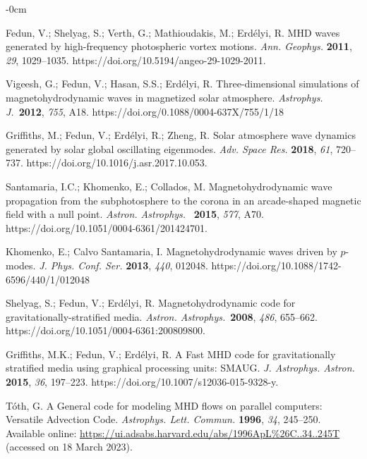 \documentclass[physics,article,accept,pdftex,moreauthors]{Definitions/mdpi}
\newcommand{\aap}{{\it Astron. Astrophys.}}
\newcommand{\apj}{{\it Astrophys. J.}}
\begin{document}
\begin{adjustwidth}{-\extralength}{0cm}
\begin{thebibliography}{999}
		Fedun, V.; Shelyag, S.; Verth, G.; Mathioudakis, M.; Erd\'elyi, R. MHD waves generated by high-frequency photospheric vortex 
motions. \emph{Ann. Geophys.} \textbf{2011}, \emph{29}, 1029--1035. https://doi.org/10.5194/angeo-29-1029-2011.
		
		{Vigeesh}, G.; {Fedun}, V.; {Hasan}, S.S.; {Erd{\'e}lyi}, R. {Three-dimensional simulations of magnetohydrodynamic waves in 
magnetized solar atmosphere}. \apj~\textbf{2012}, \emph{755}, {A18.} %
 {https://doi.org/0.1088/0004-637X/755/1/18} 
		
		Griffiths, M.; Fedun, V.; Erd\'elyi, R.; Zheng, R. Solar atmosphere wave dynamics generated by solar global oscillating eigenmodes. 
\emph{Adv. Space Res.} \textbf{2018}, \emph{61}, 720--737. https://doi.org/10.1016/j.asr.2017.10.053.
		
		Santamaria, I.C.; Khomenko, E.; Collados, M. Magnetohydrodynamic wave propagation from the subphotosphere to the corona in an arcade-shaped magnetic field with a null point. \aap~ \textbf{2015}, \emph{577}, A70. https://doi.org/10.1051/0004-6361/201424701.

		{Khomenko}, E.; {Calvo Santamaria}, I. {Magnetohydrodynamic waves driven
			by {$p$}-modes}. \emph{J. Phys. Conf. Ser.} \textbf{2013}, \emph{440}, 012048.
 {https://doi.org/10.1088/1742-6596/440/1/012048} 		
		
		Shelyag, S.; Fedun, V.; Erd\'elyi, R. Magnetohydrodynamic code for gravitationally-stratified media. \aap~\textbf{2008}, \emph{486}, 
655--662. https://doi.org/10.1051/0004-6361:200809800.
		
		Griffiths, M.K.; Fedun, V.; Erd\'elyi, R. A Fast MHD code for gravitationally stratified media using graphical processing units: 
SMAUG. \emph{J. Astrophys. Astron.} \textbf{2015}, \emph{36}, 197--223. https://doi.org/10.1007/s12036-015-9328-y.
		
		{T{\'o}th}, G. {A General code for modeling {MHD} flows on parallel
			computers: Versatile Advection Code}. \emph{Astrophys. Lett. Commun.} \textbf{1996}, \emph{34}, 245{--250.}
 {Available online:} \url{https://ui.adsabs.harvard.edu/abs/1996ApL%26C..34..245T} (accessed on 18 March 2023). 
		

\end{thebibliography}
\end{adjustwidth}
\end{document}
